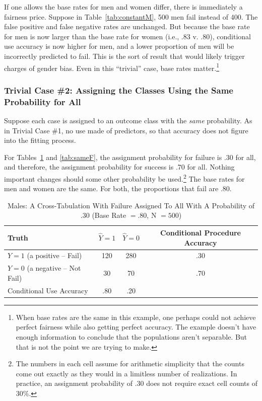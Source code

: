 \documentclass[12pt]{article}
\begin{document}
If one allows the base rates for men and women differ, there is immediately a fairness price. Suppose in Table~\ref{tab:constantM}, 500 men fail instead of 400. The false positive and false negative rates are unchanged. But because the base rate for men is now larger than the base rate for women (i.e., .83 v. .80), conditional use accuracy is now higher for men, and a lower proportion of men will be incorrectly predicted to fail. This is the sort of result that would likely trigger charges of gender bias. Even in this ``trivial'' case, base rates matter.\footnote
{
When base rates are the same in this example, one perhaps could not achieve perfect fairness while also getting perfect accuracy. The example doesn't have enough information to conclude that the populations aren't separable. But that is not the point we are trying to make.
}

\subsubsection{Trivial Case \#2: Assigning the Classes Using the Same Probability for All}

Suppose each case is assigned to an outcome class with the \textit{same} probability. As in Trivial Case \#1, no use made of predictors, so that accuracy does not figure into the fitting process.

For Tables~\ref{tab:sameM} and \ref{tab:sameF}, the assignment probability for failure is .30 for all, and therefore, the assignment probability for success is .70 for all. Nothing important changes should some other probability be used.\footnote
{
The numbers in each cell assume for arithmetic simplicity that the counts come out exactly as they would in a limitless number of realizations. In practice, an assignment probability of .30 does not require exact cell counts of 30\%.
} 
The base rates for men and women are the same. For both, the proportions that fail are .80.

\begin{table}[htbp]
\footnotesize
\caption{Males: A Cross-Tabulation With Failure Assigned To All With A Probability of .30 (Base Rate $= .80$, N $=500$)}
\begin{center}
\begin{tabular}{|l|c|c|c|}
\hline \hline
Truth & $\hat{Y} = 1$ & $\hat{Y} = 0$ & Conditional Procedure Accuracy  \\
\hline
$ Y=1$ (a positive -- Fail) & 120 & 280  & .30 \\
\hline
$Y = 0$  (a negative -- Not Fail)& 30 & 70  & .70 \\
\hline
Conditional Use Accuracy & .80 & .20 & \\
\hline
\hline
\end{tabular}
\end{center}
\label{tab:sameM}
\end{table}
\end{document}
